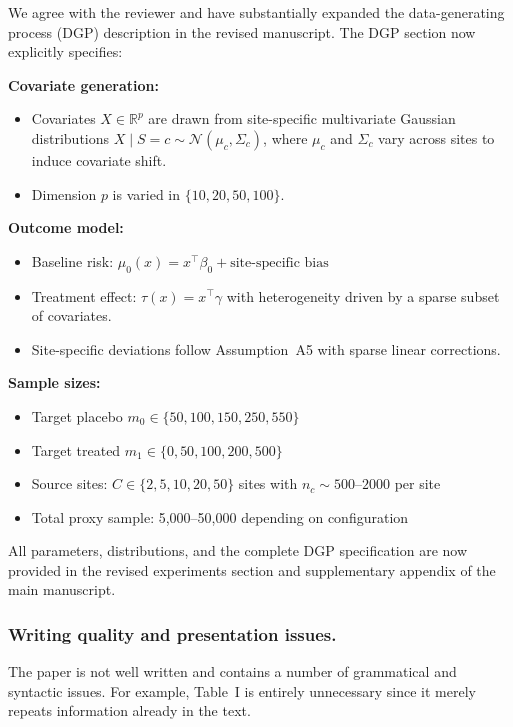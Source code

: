 {\color{blue}
We agree with the reviewer and have substantially expanded the data-generating process (DGP) description in the revised manuscript. The DGP section now explicitly specifies:

\textbf{Covariate generation:}
\begin{itemize}
\item Covariates $X \in \mathbb{R}^p$ are drawn from site-specific multivariate Gaussian distributions $X \mid S=c \sim \mathcal{N}(\mu_c, \Sigma_c)$, where $\mu_c$ and $\Sigma_c$ vary across sites to induce covariate shift.
\item Dimension $p$ is varied in $\{10, 20, 50, 100\}$.
\end{itemize}

\textbf{Outcome model:}
\begin{itemize}
\item Baseline risk: $\mu_0(x) = x^\top \beta_0 + \text{site-specific bias}$
\item Treatment effect: $\tau(x) = x^\top \gamma$ with heterogeneity driven by a sparse subset of covariates.
\item Site-specific deviations follow Assumption~A5 with sparse linear corrections.
\end{itemize}

\textbf{Sample sizes:}
\begin{itemize}
\item Target placebo $m_0 \in \{50, 100, 150, 250, 550\}$
\item Target treated $m_1 \in \{0, 50, 100, 200, 500\}$
\item Source sites: $C \in \{2, 5, 10, 20, 50\}$ sites with $n_c \sim 500$--$2000$ per site
\item Total proxy sample: 5,000--50,000 depending on configuration
\end{itemize}

All parameters, distributions, and the complete DGP specification are now provided in the revised experiments section and supplementary appendix of the main manuscript.
}

\subsubsection{Writing quality and presentation issues.}  
The paper is not well written and contains a number of grammatical and syntactic issues. For example, Table~I is entirely unnecessary since it merely repeats information already in the text.

